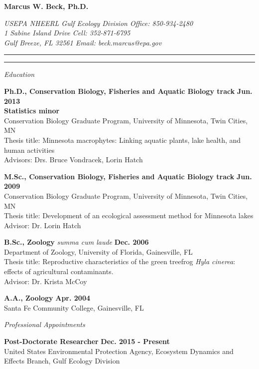 \documentclass[letterpaper,12pt]{article}
\newcommand{\sectitle}[1]{\vspace{\baselineskip} \centerline{\large{\textit{#1}}}}
\begin{document}
\raggedright

\LARGE
\centerline{{\bf Marcus W. Beck, Ph.D.}}
\normalsize
\textit{USEPA NHEERL Gulf Ecology Division \hfill Office: 850-934-2480 \\
1 Sabine Island Drive \hfill Cell: 352-871-6795 \\
Gulf Breeze, FL 32561 \hfill Email: beck.marcus@epa.gov}
\vspace{4pt}
\hrule
\vspace{2pt}
\hrule
\vspace{4pt}

\sectitle{Education}

{\bf Ph.D., Conservation Biology, Fisheries and Aquatic Biology track} \hfill {\bf Jun. 2013} \\
{\bf Statistics minor} \\
Conservation Biology Graduate Program, University of Minnesota, Twin Cities, MN \\
Thesis title: Minnesota macrophytes: Linking aquatic plants, lake health, and human activities \\
Advisors: Drs. Bruce Vondracek, Lorin Hatch

{\bf M.Sc., Conservation Biology, Fisheries and Aquatic Biology track} \hfill {\bf Jun. 2009} \\
Conservation Biology Graduate Program, University of Minnesota, Twin Cities, MN \\
Thesis title: Development of an ecological assessment method for Minnesota lakes\\
Advisor: Dr. Lorin Hatch

{\bf B.Sc., Zoology} \textit{summa cum laude} \hfill {\bf Dec. 2006} \\
Department of Zoology, University of Florida, Gainesville, FL \\
Thesis title: Reproductive characteristics of the green treefrog \textit{Hyla cinerea}: effects of agricultural contaminants. \\
Advisor: Dr. Krista McCoy

{\bf A.A., Zoology} \hfill {\bf Apr. 2004} \\
Santa Fe Community College, Gainesville, FL

\sectitle{Professional Appointments}

{\bf Post-Doctorate Researcher} \hfill {\bf Dec. 2015 - Present}\\
United States Environmental Protection Agency, Ecosystem Dynamics and Effects Branch, Gulf Ecology Division
\end{document}

